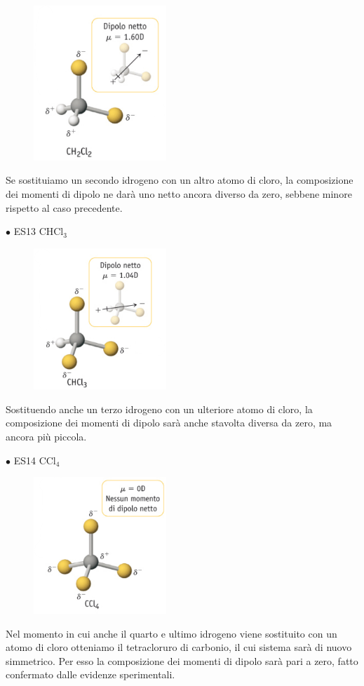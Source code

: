 \begin{figure}[htp]
    \centering
    \includegraphics[width=5cm]{immagini/CH_2Cl_2.png}
\end{figure}
Se sostituiamo un secondo idrogeno con un altro atomo di cloro, la composizione dei momenti di dipolo ne darà uno netto ancora diverso da zero, sebbene minore rispetto al caso precedente.

$\bullet$ ES13 CHCl$_3$

\begin{figure}[htp]
    \centering
    \includegraphics[width=5cm]{immagini/CHCl_3.png}
\end{figure}
Sostituendo anche un terzo idrogeno con un ulteriore atomo di cloro, la composizione dei momenti di dipolo sarà anche stavolta diversa da zero, ma ancora più piccola.

$\bullet$ ES14 CCl$_4$

\begin{figure}[htp]
    \centering
    \includegraphics[width=5cm]{immagini/CCl_4.png}
\end{figure}
Nel momento in cui anche il quarto e ultimo idrogeno viene sostituito con un atomo di cloro otteniamo il tetracloruro di carbonio, il cui sistema sarà di nuovo simmetrico. Per esso la composizione dei momenti di dipolo sarà pari a zero, fatto confermato dalle evidenze sperimentali.


